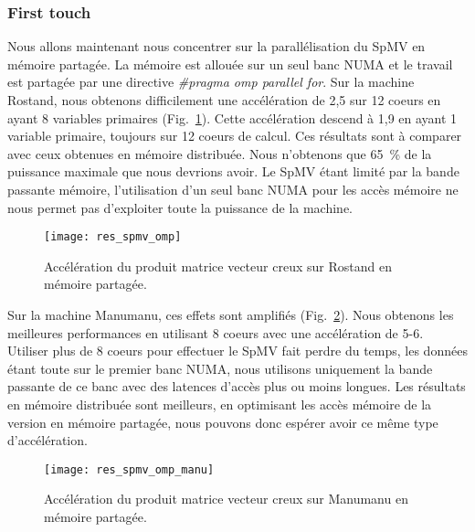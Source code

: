 \subsubsection{First touch}
Nous allons maintenant nous concentrer sur la parallélisation du SpMV en mémoire partagée.
%
La mémoire est allouée sur un seul banc NUMA et le travail est partagée par une directive {\em \#pragma omp parallel for}.
%
Sur la machine Rostand, nous obtenons difficilement une accélération de 2,5 sur 12 coeurs en ayant 8 variables primaires (Fig.~\ref{fig:res_spmv_omp_rostand}).
%
Cette accélération descend à 1,9 en ayant 1 variable primaire, toujours sur 12 coeurs de calcul.
%
Ces résultats sont à comparer avec ceux obtenues en mémoire distribuée.
%
Nous n'obtenons que 65~\% de la puissance maximale que nous devrions avoir.
%
Le SpMV étant limité par la bande passante mémoire, l'utilisation d'un seul banc NUMA pour les accès mémoire ne nous permet pas d'exploiter toute la puissance de la machine.


\begin{figure}[t!]
  \centering
  \texttt{[image: res\_spmv\_omp]}
  \caption{Accélération du produit matrice vecteur creux sur Rostand en mémoire partagée.}
  \label{fig:res_spmv_omp_rostand}
\end{figure}



Sur la machine Manumanu, ces effets sont amplifiés (Fig.~\ref{fig:res_spmv_omp_manumanu}).
%
Nous obtenons les meilleures performances en utilisant 8 coeurs avec une accélération de 5-6.
%
Utiliser plus de 8 coeurs pour effectuer le SpMV fait perdre du temps, les données étant toute sur le premier banc NUMA, nous utilisons uniquement la bande passante de ce banc avec des latences d'accès plus ou moins longues.
%
Les résultats en mémoire distribuée sont meilleurs, en optimisant les accès mémoire de la version en mémoire partagée, nous pouvons donc espérer avoir ce même type d'accélération.


\begin{figure}[t!]
  \centering
  \texttt{[image: res\_spmv\_omp\_manu]}
  \caption{Accélération du produit matrice vecteur creux sur Manumanu en mémoire partagée.}
  \label{fig:res_spmv_omp_manumanu}
\end{figure}
